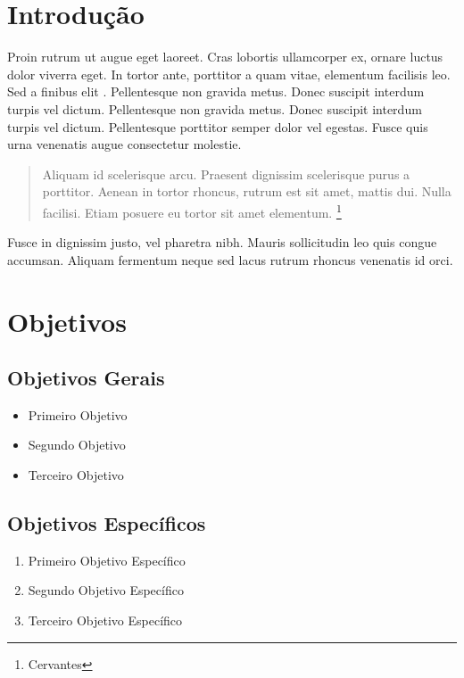 \documentclass[a4paper, 11pt]{article}
\begin{document}
    \begin{multicols}{2}
        \section{Introdução}
        Proin rutrum ut augue eget laoreet. Cras lobortis ullamcorper ex,     ornare luctus dolor viverra eget. In tortor ante, porttitor a quam     vitae, elementum facilisis leo. Sed a finibus elit \cite{moyses}. Pellentesque non     gravida metus. Donec suscipit interdum turpis vel dictum. Pellentesque     non gravida metus. Donec suscipit interdum turpis vel dictum.     Pellentesque porttitor semper dolor vel egestas. Fusce quis urna     venenatis augue consectetur molestie.
    
        \begin{quote}
            Aliquam id scelerisque arcu. Praesent dignissim scelerisque purus a     porttitor. Aenean in tortor rhoncus, rutrum est sit amet, mattis     dui. Nulla facilisi. Etiam posuere eu tortor sit amet elementum. \footnote{Cervantes}
        \end{quote}
        
        Fusce in dignissim justo, vel pharetra nibh. Mauris sollicitudin leo quis congue accumsan. Aliquam fermentum neque sed lacus rutrum rhoncus venenatis id orci. 
        
        \section{Objetivos}
        \subsection{Objetivos Gerais}
        
            \begin{itemize}
                \item Primeiro Objetivo
                \item Segundo Objetivo
                \item Terceiro Objetivo
            \end{itemize}
        
        \subsection{Objetivos Específicos}
        
            \begin{enumerate}
                \item Primeiro Objetivo Específico
                \item Segundo Objetivo Específico
                \item Terceiro Objetivo Específico
            \end{enumerate}
        

\end{multicols}
\end{document}
